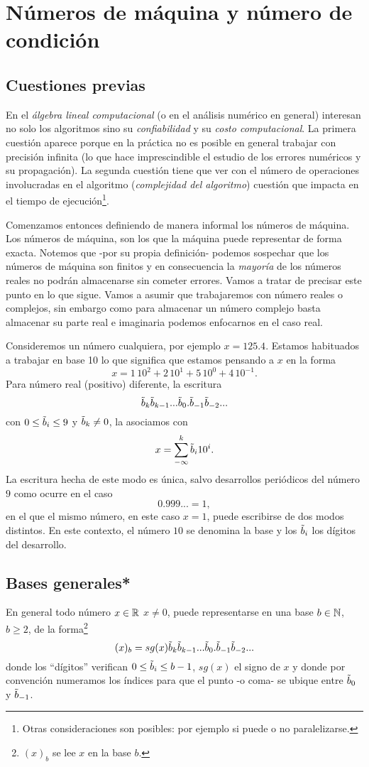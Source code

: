 \chapter{Números de máquina y número de condición}
\setcounter{equation}{0}
\section{Cuestiones previas}

En el \emph{álgebra lineal computacional} (o en el análisis numérico en general) interesan no solo los algoritmos sino su \emph{confiabilidad}  y su \emph{costo computacional}. La primera cuestión aparece porque en la práctica no es posible en general trabajar con precisión infinita (lo que hace imprescindible el  estudio de los errores numéricos y su propagación). La segunda cuestión tiene que ver con el número de operaciones involucradas en el algoritmo (\emph{complejidad del algoritmo}) cuestión que impacta en el tiempo de ejecución\footnote{Otras consideraciones son posibles: por ejemplo si puede o no paralelizarse.}.

Comenzamos entonces definiendo de manera informal los números de máquina.
\tcc
Los números de máquina, son los que la máquina puede representar de forma exacta.
\etcc
Notemos que -por su propia definición- podemos sospechar que los números de máquina son finitos y en consecuencia la \emph{mayoría} de los números reales no podrán almacenarse sin cometer errores. Vamos a tratar de precisar este punto en lo que sigue. Vamos a asumir que trabajaremos con número reales o complejos, sin embargo como para almacenar un número complejo basta almacenar su parte real e imaginaria podemos enfocarnos en el caso real.

Consideremos un número cualquiera, por ejemplo $x=125.4$. Estamos habituados a trabajar en base 10 lo que significa que estamos pensando a $x$ en la forma
$$
x=1\,10^2+2\,10^1+5\,10^0+4\,10^{-1}.
$$
Para número real (positivo) diferente, la escritura
$$
\tilde b_k\tilde b_{k-1}...\tilde b_0.\tilde b_{-1}\tilde b_{-2}...
$$
con $0\le \tilde b_i\le 9$ y $\tilde b_k\neq 0$, la asociamos con
$$
x=\sum_{-\infty}^k \tilde b_{i}10^{i}.
$$
La escritura hecha de este modo es \'unica, salvo desarrollos periódicos del número $9$ como ocurre en el caso
$$
0.999...=1,
$$
en el que el mismo número, en este caso $x=1$, puede escribirse de dos modos distintos.
En este contexto, el número $10$ se denomina la base y los $\tilde b_i$ los dígitos del desarrollo.
\section{Bases generales*}
En general todo número  $x\in \mathbb R$ $x\neq 0$, puede representarse en una base $b\in\mathbb N$, $b\ge 2$, de la forma\footnote{$(x)_b$ se lee $x$ en la base $b$.}
\begin{equation}
 \label{eq:represbaseb}
(x)_b=sg(x)\tilde b_k\tilde b_{k-1}...\tilde b_0.\tilde b_{-1}\tilde b_{-2}...
 \end{equation}
donde los ``dígitos'' verifican $0\le \tilde b_i\le b-1$, $sg(x)$ el signo de $x$ y donde por convención numeramos los índices para que el punto -o coma- se ubique entre $\tilde b_0$ y $\tilde b_{-1}$.

